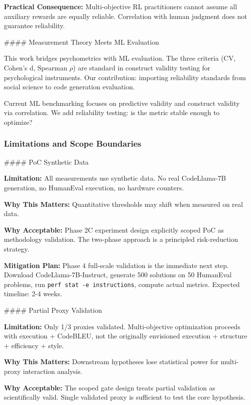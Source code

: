 \textbf{Practical Consequence:} Multi-objective RL practitioners cannot assume all auxiliary rewards are equally reliable. Correlation with human judgment does not guarantee reliability.

\#\#\#\# Measurement Theory Meets ML Evaluation

This work bridges psychometrics with ML evaluation. The three criteria (CV, Cohen's d, Spearman $\rho$) are standard in construct validity testing for psychological instruments. Our contribution: importing reliability standards from social science to code generation evaluation.

Current ML benchmarking focuses on predictive validity and construct validity via correlation. We add reliability testing: is the metric stable enough to optimize?

\subsubsection{Limitations and Scope Boundaries}

\#\#\#\# PoC Synthetic Data

\textbf{Limitation:} All measurements use synthetic data. No real CodeLlama-7B generation, no HumanEval execution, no hardware counters.

\textbf{Why This Matters:} Quantitative thresholds may shift when measured on real data.

\textbf{Why Acceptable:} Phase 2C experiment design explicitly scoped PoC as methodology validation. The two-phase approach is a principled risk-reduction strategy.

\textbf{Mitigation Plan:} Phase 4 full-scale validation is the immediate next step. Download CodeLlama-7B-Instruct, generate 500 solutions on 50 HumanEval problems, run \texttt{perf stat -e instructions}, compute actual metrics. Expected timeline: 2-4 weeks.

\#\#\#\# Partial Proxy Validation

\textbf{Limitation:} Only 1/3 proxies validated. Multi-objective optimization proceeds with execution + CodeBLEU, not the originally envisioned execution + structure + efficiency + style.

\textbf{Why This Matters:} Downstream hypotheses lose statistical power for multi-proxy interaction analysis.

\textbf{Why Acceptable:} The scoped gate design treats partial validation as scientifically valid. Single validated proxy is sufficient to test the core hypothesis.


